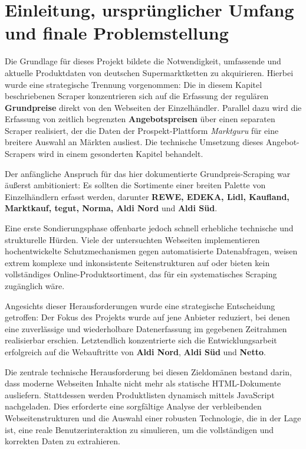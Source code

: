 \documentclass[12pt, a4paper]{report} %
\begin{document}
\section{Einleitung, ursprünglicher Umfang und finale Problemstellung}
Die Grundlage für dieses Projekt bildete die Notwendigkeit, umfassende und aktuelle Produktdaten von deutschen Supermarktketten zu akquirieren. Hierbei wurde eine strategische Trennung vorgenommen: Die in diesem Kapitel beschriebenen Scraper konzentrieren sich auf die Erfassung der regulären \textbf{Grundpreise} direkt von den Webseiten der Einzelhändler. Parallel dazu wird die Erfassung von zeitlich begrenzten \textbf{Angebotspreisen} über einen separaten Scraper realisiert, der die Daten der Prospekt-Plattform \textit{Marktguru} für eine breitere Auswahl an Märkten ausliest. Die technische Umsetzung dieses Angebot-Scrapers wird in einem gesonderten Kapitel behandelt.

Der anfängliche Anspruch für das hier dokumentierte Grundpreis-Scraping war äußerst ambitioniert: Es sollten die Sortimente einer breiten Palette von Einzelhändlern erfasst werden, darunter \textbf{REWE, EDEKA, Lidl, Kaufland, Marktkauf, tegut, Norma, Aldi Nord} und \textbf{Aldi Süd}.

Eine erste Sondierungsphase offenbarte jedoch schnell erhebliche technische und strukturelle Hürden. Viele der untersuchten Webseiten implementieren hochentwickelte Schutzmechanismen gegen automatisierte Datenabfragen, weisen extrem komplexe und inkonsistente Seitenstrukturen auf oder bieten kein vollständiges Online-Produktsortiment, das für ein systematisches Scraping zugänglich wäre.

Angesichts dieser Herausforderungen wurde eine strategische Entscheidung getroffen: Der Fokus des Projekts wurde auf jene Anbieter reduziert, bei denen eine zuverlässige und wiederholbare Datenerfassung im gegebenen Zeitrahmen realisierbar erschien. Letztendlich konzentrierte sich die Entwicklungsarbeit erfolgreich auf die Webauftritte von \textbf{Aldi Nord}, \textbf{Aldi Süd} und \textbf{Netto}.

Die zentrale technische Herausforderung bei diesen Zieldomänen bestand darin, dass moderne Webseiten Inhalte nicht mehr als statische HTML-Dokumente ausliefern. Stattdessen werden Produktlisten dynamisch mittels JavaScript nachgeladen. Dies erforderte eine sorgfältige Analyse der verbleibenden Webseitenstrukturen und die Auswahl einer robusten Technologie, die in der Lage ist, eine reale Benutzerinteraktion zu simulieren, um die vollständigen und korrekten Daten zu extrahieren.
\end{document}
